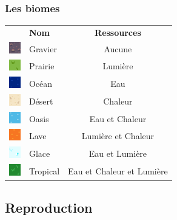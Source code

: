 \subsubsection{Les biomes}

\begin{center}
    \begin{tabular}{c l c}
      & \textbf{Nom} & \textbf{Ressources} \\
      \includegraphics[width=0.5cm]{29.png} & Gravier & Aucune \\
      \includegraphics[width=0.5cm]{09.png} & Prairie & Lumière \\
      \includegraphics[width=0.5cm]{ocean.png} & Océan & Eau \\
      \includegraphics[width=0.5cm]{40.png} & Désert & Chaleur \\
      \includegraphics[width=0.5cm]{54.png} & Oasis & Eau et Chaleur \\
      \includegraphics[width=0.5cm]{63.png} & Lave & Lumière et Chaleur \\
      \includegraphics[width=0.5cm]{94.png} & Glace & Eau et Lumière \\
      \includegraphics[width=0.5cm]{73.png} & Tropical & Eau et Chaleur et Lumière \\
    \end{tabular}
\end{center}

\subsection{Reproduction}

